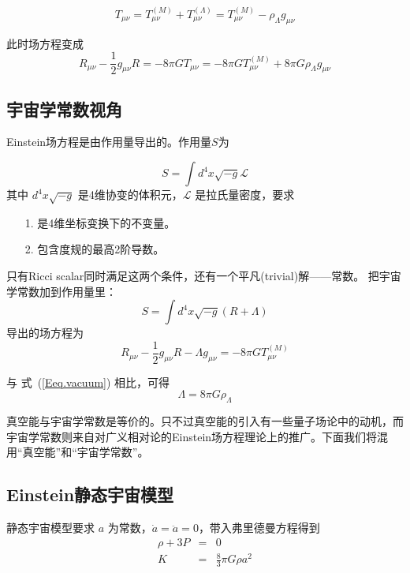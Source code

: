 \documentclass[]{ctexart}
\newcommand{\refeq}[1]{式~(\ref{#1})}
\begin{document}
\begin{equation}
    T_{\mu\nu} = T_{\mu\nu}^{(M)} + T_{\mu\nu}^{(\Lambda)} = T_{\mu\nu}^{(M)} - \rho_\Lambda g_{\mu\nu}
\end{equation}

此时场方程变成 
\begin{equation} \label{Eeq.vacuum}
    R_{\mu\nu} - \frac{1}{2} g_{\mu\nu} R = -8\pi G T_{\mu\nu} =  -8\pi G T_{\mu\nu}^{(M)} +  8\pi G \rho_\Lambda g_{\mu\nu}
\end{equation}

\subsection{宇宙学常数视角}
Einstein场方程是由作用量导出的。作用量$S$为

\begin{equation}
    S = \int d^4 x \sqrt{-g} \mathcal{L} 
\end{equation}
其中 $d^4 x \sqrt{-g}$ 是4维协变的体积元，$\mathcal{L}$ 是拉氏量密度，要求 
\begin{itemize}
    \item[1.] 是4维坐标变换下的不变量。
    \item[2.] 包含度规的最高2阶导数。
\end{itemize}

只有Ricci scalar同时满足这两个条件，还有一个平凡(trivial)解——常数。 把宇宙学常数加到作用量里：
\begin{equation}
    S = \int d^4 x \sqrt{-g} \left( R  + \Lambda \right) 
\end{equation}
导出的场方程为
\begin{equation}
    R_{\mu\nu} - \frac{1}{2} g_{\mu\nu} R - \Lambda g_{\mu\nu} =  -8\pi G T_{\mu\nu}^{(M)} 
\end{equation}

与 \refeq{Eeq.vacuum} 相比，可得
\begin{equation}
    \Lambda = 8\pi G \rho_\Lambda 
\end{equation}

真空能与宇宙学常数是等价的。只不过真空能的引入有一些量子场论中的动机，而宇宙学常数则来自对广义相对论的Einstein场方程理论上的推广。下面我们将混用“真空能”和“宇宙学常数”。

\subsection{Einstein静态宇宙模型}

静态宇宙模型要求 $a$ 为常数，$\dot{a}=\ddot{a}=0$，带入弗里德曼方程得到
\begin{eqnarray}
    \rho+3P&=&0 \\
    K &=& \frac{8}{3} \pi G \rho a^2
\end{eqnarray}
\end{document}
